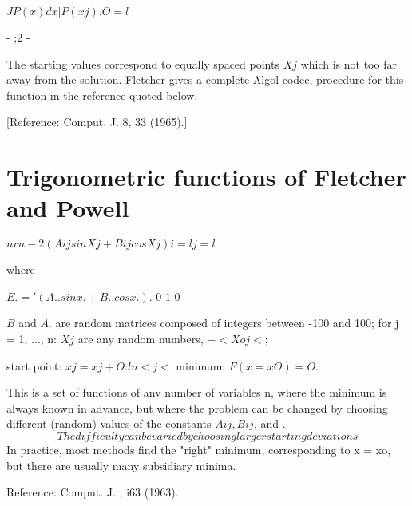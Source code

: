  
                      $J P(x) dx | P(xj) .
                    O                                   =l$
 
 
                                - ;2 -
 
 
The starting values correspond to equally spaced points $Xj$ which is not
too far away from the solution.  Fletcher gives a complete Algol-codec,
procedure for this function in the reference quoted below.
 
[Reference:  Comput. J. 8, 33 (1965).]
 
\section{Trigonometric functions of Fletcher and Powell}
                   $ n r n                                 -2
                                  (Aij sin Xj + Bij cos Xj)
                i=l  j=l$
 
where
 
 
                 $ E. = '  (A.. sin x . + B.. cos x .) $.
                               0 1     0
 
 
$B $ and $A$. are random matrices composed of integers between -100 and
100;  for j = 1, ..., n:  $Xj$ are any random numbers, $- < Xoj < ;$
 
start point:         $xj = x j + O.l     n < j <$
minimum:             $F(x = xO) = O $.
 
     This is a set of functions of anv number of variables n, where the
minimum is always known in advance, but where the problem can be changed
by choosing different (random) values of the constants $Aij, Bij$, and .$$
The difficulty can be varied by choosing larger starting deviations  $$
In practice, most methods find the "right" minimum, corresponding to
x = xo, but there are usually many subsidiary minima.
 
Reference:  Comput. J. , i63 (1963).
 
